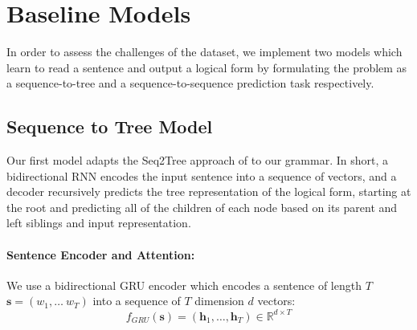\section{Baseline Models}
\label{sec:modeling}

In order to assess the challenges of the dataset, we implement two models which learn to read a sentence and output a logical form by formulating the problem as a sequence-to-tree and a sequence-to-sequence prediction task respectively.

\subsection{Sequence to Tree Model}

Our first model adapts the Seq2Tree approach of \citep{dong2016language} to our grammar. In short, a bidirectional RNN encodes the input sentence into a sequence of vectors, and a decoder recursively predicts the tree representation of the logical form, starting at the root and predicting all of the children of each node based on its parent and left siblings and input representation.

\paragraph{Sentence Encoder and Attention: } We use a bidirectional GRU encoder \citep{ChoMGBBSB14} which encodes a sentence of length $T$  $\mathbf{s} = (w_1, \ldots \ w_{T})$ into a sequence of $T$ dimension $d$ vectors:
\begin{equation*}
f_{GRU}(\textbf{s}) = (\mathbf{h}_1,\ldots, \mathbf{h}_T) \in \mathbb{R}^{d \times T}
\end{equation*}
\begin{comment}
The tree decoder is then conditioned on the sequence encoder output via an attention mechanism.
We follow the attention implementation of \cite{opennmt}. Given $K$ matrices $\textbf{M}^\alpha = (M_1^\alpha,\ldots, M_1^\alpha) \in \mathbb{R}^{d \times d \times K}$, we have:
\begin{align*}
& \alpha^k_n = \text{softmax}\Big(\frac{\mathbf{x}^{\text{T}} M^{\alpha}_k (\mathbf{h}_1,\ldots, \mathbf{h}_T)}{\sqrt{d}} \Big) \\
& \mathbf{x}^{\alpha} = \sum_{k=1}^K {\alpha^k_n}^{\text{T}} (\mathbf{h}_1,\ldots, \mathbf{h}_T) \\
& \text{attn}(\mathbf{x}, (\mathbf{h}_1,\ldots, \mathbf{h}_T); \textbf{M}^\alpha) = \mathbf{x} + \mathbf{x}^{\alpha}
\end{align*}
\end{comment}
